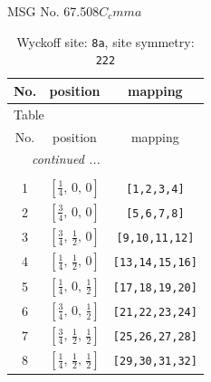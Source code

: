 \documentclass[fleqn,8pt]{jsarticle}
\begin{document}
\setcounter{MaxMatrixCols}{32}

\renewcommand{\tablename}{Table~}
\renewcommand{\figurename}{Figure~}
\begin{center}
\LARGE
MSG No. 67.508\quad$C_{c}mma$
\end{center}
\renewcommand{\arraystretch}{1.2}
\begin{longtable}{ccc}
\caption{Wyckoff site: {\tt 8a}, site symmetry: {\tt 222}}
 \\
 \hline \hline
No. & position & mapping \\ \hline \endfirsthead

\multicolumn{2}{l}{\tablename\ \thetable{}} \\
 \hline \hline
No. & position & mapping \\ \hline \endhead

 \hline \hline
\multicolumn{2}{r}{\footnotesize\it continued ...} \\ \endfoot

 \hline \hline
\multicolumn{2}{r}{} \\ \endlastfoot

1 & $\left[ \frac{1}{4},\, 0,\, 0 \right]$ & {\tt [1,2,3,4]} \\ \hline
2 & $\left[ \frac{3}{4},\, 0,\, 0 \right]$ & {\tt [5,6,7,8]} \\ \hline
3 & $\left[ \frac{3}{4},\, \frac{1}{2},\, 0 \right]$ & {\tt [9,10,11,12]} \\ \hline
4 & $\left[ \frac{1}{4},\, \frac{1}{2},\, 0 \right]$ & {\tt [13,14,15,16]} \\ \hline
5 & $\left[ \frac{1}{4},\, 0,\, \frac{1}{2} \right]$ & {\tt [17,18,19,20]} \\ \hline
6 & $\left[ \frac{3}{4},\, 0,\, \frac{1}{2} \right]$ & {\tt [21,22,23,24]} \\ \hline
7 & $\left[ \frac{3}{4},\, \frac{1}{2},\, \frac{1}{2} \right]$ & {\tt [25,26,27,28]} \\ \hline
8 & $\left[ \frac{1}{4},\, \frac{1}{2},\, \frac{1}{2} \right]$ & {\tt [29,30,31,32]} \\
\end{longtable}
\renewcommand{\arraystretch}{1.2}
\end{document}

